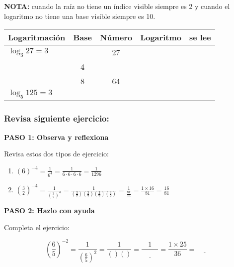\documentclass[12pt,a4paper]{article}
\begin{document}
\vspace{0.5cm}

\textbf{NOTA:} cuando la raíz no tiene un índice visible siempre es 2 y cuando el logaritmo no tiene una base visible siempre es 10.

\vspace{0.5cm}

\begin{center}
\begin{tabular}{|l|c|c|c|c|}
\hline
\cellcolor{fondoazul}\textbf{Logaritmación} & \textbf{Base} & \textbf{Número} & \textbf{Logaritmo} & \textbf{se lee} \\
\hline
$\log_3 27 = 3$ & & 27 & & \\
\hline
& 4 & & & \\
\hline
& 8 & 64 & & \\
\hline
$\log_5 125 = 3$ & & & & \\
\hline
\end{tabular}
\end{center}

\vspace{1cm}

\subsubsection*{Revisa siguiente ejercicio:}

\textbf{PASO 1: Observa y reflexiona}

Revisa estos dos tipos de ejercicio:

\begin{enumerate}
\item $(6)^{-4} = \frac{1}{6^4} = \frac{1}{6 \cdot 6 \cdot 6 \cdot 6} = \frac{1}{1296}$

\item $\left(\frac{3}{2}\right)^{-4} = \frac{1}{\left(\frac{3}{2}\right)^4} = \frac{1}{\left(\frac{3}{2}\right)\left(\frac{3}{2}\right)\left(\frac{3}{2}\right)\left(\frac{3}{2}\right)} = \frac{1}{\frac{81}{16}} = \frac{1 \times 16}{81} = \frac{16}{81}$
\end{enumerate}

\vspace{0.5cm}

\textbf{PASO 2: Hazlo con ayuda}

Completa el ejercicio:

$$\left(\frac{6}{5}\right)^{-2} = \frac{1}{\left(\frac{6}{5}\right)^2} = \frac{1}{( )( )} = \frac{1}{\underline{\hspace{1cm}}} = \frac{1 \times 25}{36} = \underline{\hspace{1cm}}$$
\end{document}
